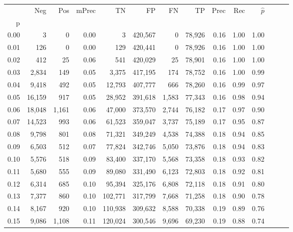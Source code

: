 \begin{tabular}{rrrrrrrrrrrrrr}
\toprule
{} &     Neg &    Pos & mPrec &       TN &       FP &      FN &      TP &  Prec &   Rec & $\hat{p}$ \\
p    &         &        &       &          &          &         &         &       &       &           \\
\midrule
0.00 &       3 &      0 &  0.00 &        3 &  420,567 &       0 &  78,926 &  0.16 &  1.00 &      1.00 \\
0.01 &     126 &      0 &  0.00 &      129 &  420,441 &       0 &  78,926 &  0.16 &  1.00 &      1.00 \\
0.02 &     412 &     25 &  0.06 &      541 &  420,029 &      25 &  78,901 &  0.16 &  1.00 &      1.00 \\
0.03 &   2,834 &    149 &  0.05 &    3,375 &  417,195 &     174 &  78,752 &  0.16 &  1.00 &      0.99 \\
0.04 &   9,418 &    492 &  0.05 &   12,793 &  407,777 &     666 &  78,260 &  0.16 &  0.99 &      0.97 \\
0.05 &  16,159 &    917 &  0.05 &   28,952 &  391,618 &   1,583 &  77,343 &  0.16 &  0.98 &      0.94 \\
0.06 &  18,048 &  1,161 &  0.06 &   47,000 &  373,570 &   2,744 &  76,182 &  0.17 &  0.97 &      0.90 \\
0.07 &  14,523 &    993 &  0.06 &   61,523 &  359,047 &   3,737 &  75,189 &  0.17 &  0.95 &      0.87 \\
0.08 &   9,798 &    801 &  0.08 &   71,321 &  349,249 &   4,538 &  74,388 &  0.18 &  0.94 &      0.85 \\
0.09 &   6,503 &    512 &  0.07 &   77,824 &  342,746 &   5,050 &  73,876 &  0.18 &  0.94 &      0.83 \\
0.10 &   5,576 &    518 &  0.09 &   83,400 &  337,170 &   5,568 &  73,358 &  0.18 &  0.93 &      0.82 \\
0.11 &   5,680 &    555 &  0.09 &   89,080 &  331,490 &   6,123 &  72,803 &  0.18 &  0.92 &      0.81 \\
0.12 &   6,314 &    685 &  0.10 &   95,394 &  325,176 &   6,808 &  72,118 &  0.18 &  0.91 &      0.80 \\
0.13 &   7,377 &    860 &  0.10 &  102,771 &  317,799 &   7,668 &  71,258 &  0.18 &  0.90 &      0.78 \\
0.14 &   8,167 &    920 &  0.10 &  110,938 &  309,632 &   8,588 &  70,338 &  0.19 &  0.89 &      0.76 \\
0.15 &   9,086 &  1,108 &  0.11 &  120,024 &  300,546 &   9,696 &  69,230 &  0.19 &  0.88 &      0.74 \\

\end{tabular}
